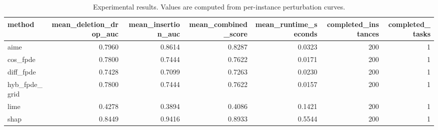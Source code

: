 \begin{table}[t]
\caption{Experimental results. Values are computed from per-instance perturbation curves.}
\label{tab:main_results_computed}
\centering
\begin{tabular}{lrrrrrr}
\toprule
method & mean\_deletion\_drop\_auc & mean\_insertion\_auc & mean\_combined\_score & mean\_runtime\_seconds & completed\_instances & completed\_tasks \\
\midrule
aime & 0.7960 & 0.8614 & 0.8287 & 0.0323 & 200 & 1 \\
cos\_fpde & 0.7800 & 0.7444 & 0.7622 & 0.0171 & 200 & 1 \\
diff\_fpde & 0.7428 & 0.7099 & 0.7263 & 0.0230 & 200 & 1 \\
hyb\_fpde\_grid & 0.7800 & 0.7444 & 0.7622 & 0.0157 & 200 & 1 \\
lime & 0.4278 & 0.3894 & 0.4086 & 0.1421 & 200 & 1 \\
shap & 0.8449 & 0.9416 & 0.8933 & 0.5544 & 200 & 1 \\
\bottomrule
\end{tabular}

\end{table}
